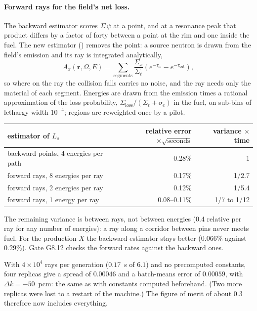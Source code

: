 \paragraph{Forward rays for the field's net loss.} The backward estimator scores
$\Sigma\,\psi$ at a point, and at a resonance peak that product differs by a factor of forty between
a point at the rim and one inside the fuel. The new estimator
() removes the point: a source neutron is drawn from the field's
emission and its ray is integrated analytically,
\begin{equation}
A_x(\mathbf r,\Omega,E)=\sum_{\text{segments}}\frac{\Sigma_x}{\Sigma_t}\left(e^{-\tau_{\text{in}}}-e^{-\tau_{\text{out}}}\right),
\end{equation}
so where on the ray the collision falls carries no noise, and the ray needs only the material of
each segment. Energies are drawn from the emission times a rational approximation of the loss
probability, $\Sigma_{\text{loss}}/(\Sigma_t+\sigma_e)$ in the fuel, on sub-bins of lethargy width
$10^{-4}$; regions are reweighted once by a pilot.
\begin{center}\small
\begin{tabular}{@{}lrr@{}}
\toprule
estimator of $L_s$ & relative error $\times\sqrt{\text{seconds}}$ & variance $\times$ time\\
\midrule
backward points, 4 energies per path & 0.28\% & 1\\
forward rays, 8 energies per ray & 0.17\% & 1/2.7\\
forward rays, 2 energies per ray & 0.12\% & 1/5.4\\
forward rays, 1 energy per ray & 0.08--0.11\% & 1/7 to 1/12\\
\bottomrule
\end{tabular}
\end{center}
The remaining variance is between rays, not between energies (0.4 relative per ray for any number
of energies): a ray along a corridor between pins never meets fuel. For the production $X$ the
backward estimator stays better ($0.066\%$ against $0.29\%$). Gate G8.12 checks the forward rates
against the backward ones.

With $4\times10^4$ rays per generation ($0.17$~s of $6.1$) and no precomputed constants, four
replicas give a spread of $0.00046$ and a batch-means error of $0.00059$, with
$\Delta k=-50$~pcm: the same as with constants computed beforehand. (Two more replicas were lost to
a restart of the machine.) The figure of merit of about $0.3$ therefore now includes everything.

